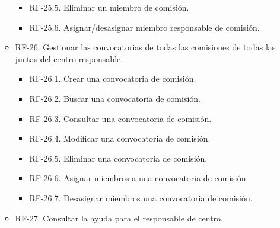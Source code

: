 \begin{itemize}
\begin{itemize}
\begin{itemize}
                  \item RF-25.5. Eliminar un miembro de comisión.
                  \item RF-25.6. Asignar/desasignar miembro responsable de comisión.
             \end{itemize} 
        \item RF-26. Gestionar las convocatorias de todas las comisiones de todas las juntas del centro responsable.
             \begin{itemize}
                  \item RF-26.1. Crear una convocatoria de comisión.
                  \item RF-26.2. Buscar una convocatoria de comisión.
                  \item RF-26.3. Consultar una convocatoria de comisión.
                  \item RF-26.4. Modificar una convocatoria de comisión.
                  \item RF-26.5. Eliminar una convocatoria de comisión.
                  \item RF-26.6. Asignar miembros a una convocatoria de comisión.
                  \item RF-26.7. Desasignar miembros una convocatoria de comisión.
             \end{itemize}
         \item RF-27. Consultar la ayuda para el responsable de centro.
     \end{itemize}


\end{itemize}
